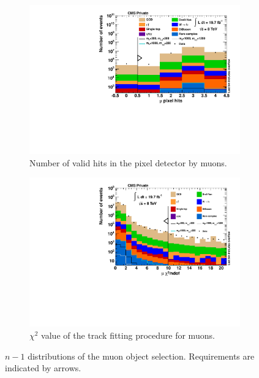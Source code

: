 \begin{figure}[!htb]
  \ContinuedFloat
  \centering
  \begin{subfigure}[b]{0.495\textwidth}
    \centering
    \includegraphics[width=\textwidth]{plots/nMuon_ValidPixelHitsCm.pdf}
    \caption{Number of valid hits in the pixel detector by muons.\label{fig:muo_validpixelhits}}
  \end{subfigure}
  \begin{subfigure}[b]{0.495\textwidth}
    \centering
    \includegraphics[width=\textwidth]{plots/nMuon_TrkChi.pdf}
    \caption{$\chi^2$ value of the track fitting procedure for muons.\label{fig:muo_chi2}}
  \end{subfigure}

  \caption{$n - 1$ distributions of the muon object selection. Requirements are indicated by arrows.}
  \label{fig:n-1}
\end{figure}



